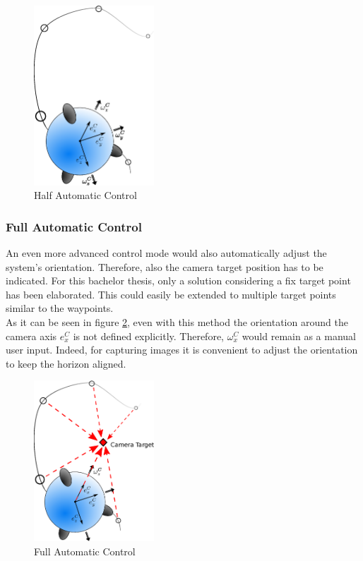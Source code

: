\begin{figure}[H] %
	\begin{center}
		\includegraphics[width=0.4\textwidth]{HAC.eps}
		\caption[Half automatic control]{Half Automatic Control}  
		\label{fig:half_automatic_control}		
	\end{center}
\end{figure}

\subsubsection{Full Automatic Control}
An even more advanced control mode would also automatically adjust the system's orientation. Therefore, also the camera target position has to be indicated. For this bachelor thesis, only a solution considering a fix target point has been elaborated. This could easily be extended to multiple target points similar to the waypoints. \\ As it can be seen in figure \ref{fig:full_automatic_control}, even with this method the orientation around the camera axis $e_x^C$ is not defined explicitly. Therefore, $\omega_x^C$ would remain as a manual user input. Indeed, for capturing images it is convenient to adjust the orientation to keep the horizon aligned.


\begin{figure}[H] %
	\begin{center}
		\includegraphics[width=0.4\textwidth]{FAComega.eps}
		\caption[Full automatic control]{Full Automatic Control}  
		\label{fig:full_automatic_control}		
	\end{center}
\end{figure}